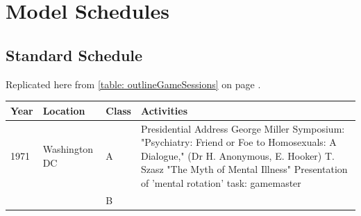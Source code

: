 \begin{refsection}
\begin{itemize}
\end{itemize}

\pagebreak 

\chapter{Model Schedules}
\label{modelschedules}

\section{Standard Schedule}
\label{standardschedule}

Replicated here from \ref{table: outlineGameSessions} on page \pageref{table: outlineGameSessions}.

 \begin{longtable}[!t]{ | p{1cm} | p{2cm} | p{1cm} |  p{10cm} | }
\hline

\textbf{Year}&\textbf{Location}&\textbf{Class}&\textbf{Activities} \\ \hline
1971&Washington DC&A&Presidential Address\: George Miller \newline
Symposium: "Psychiatry: Friend or Foe to Homosexuals: A Dialogue," (Dr H. Anonymous, E. Hooker)\newline
T. Szasz "The Myth of Mental Illness"\newline
Presentation of 'mental rotation' task: gamemaster\\

&&B&


\end{longtable}
\end{refsection}
